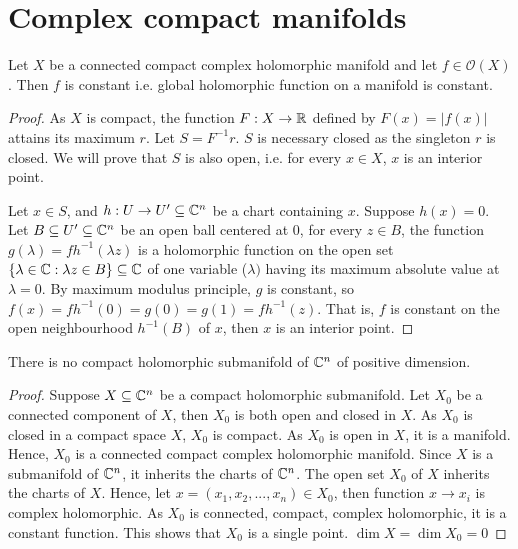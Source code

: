\section{Complex compact manifolds}

\begin{theorem}
	Let $X$ be a connected compact complex holomorphic manifold and let $f \in \mathcal{O}(X)$. Then $f$ is constant i.e. global holomorphic function on a manifold is constant.
	\begin{proof}
		As $X$ is compact, the function $F : X \to \mathbb{R}$ defined by $F(x) = |f(x)|$ attains its maximum $r$. Let $S = F^{-1} r$. $S$ is necessary closed as the singleton $r$ is closed. We will prove that $S$ is also open, i.e. for every $x \in X$, $x$ is an interior point.
		
		Let $x \in S$, and $h: U \to U' \subseteq \mathbb{C}^n$ be a chart containing $x$. Suppose $h(x) = 0$. Let $B \subseteq U' \subseteq \mathbb{C}^n$ be an open ball centered at $0$, for every $z \in B$, the function $g(\lambda) = fh^{-1}(\lambda z)$ is a holomorphic function on the open set $\{\lambda \in \mathbb{C}: \lambda z \in B\} \subseteq \mathbb{C}$ of one variable ($\lambda)$ having its maximum absolute value at $\lambda = 0$. By maximum modulus principle, $g$ is constant, so $f(x) = f h^{-1}(0) = g(0) = g(1) = f h^{-1}(z)$. That is, $f$ is constant on the open neighbourhood $h^{-1}(B)$ of $x$, then $x$ is an interior point.
	\end{proof}
\end{theorem}

\begin{corollary}
	There is no compact holomorphic submanifold of $\mathbb{C}^n$ of positive dimension.
	\begin{proof}
		Suppose $X \subseteq \mathbb{C}^n$ be a compact holomorphic submanifold. Let $X_0$ be a connected component of $X$, then $X_0$ is both open and closed in $X$. As $X_0$ is closed in a compact space $X$, $X_0$ is compact. As $X_0$ is open in $X$, it is a manifold. Hence, $X_0$ is a connected compact complex holomorphic manifold.
		Since $X$ is a submanifold of $\mathbb{C}^n$, it inherits the charts of $\mathbb{C}^n$. The open set $X_0$ of $X$ inherits the charts of $X$. Hence, let $x = (x_1, x_2, ..., x_n) \in X_0$, then function $x \to x_i$ is complex holomorphic. As $X_0$ is connected, compact, complex holomorphic, it is a constant function. This shows that $X_0$ is a single point. $\dim X = \dim X_0 = 0$
	\end{proof}
\end{corollary}



